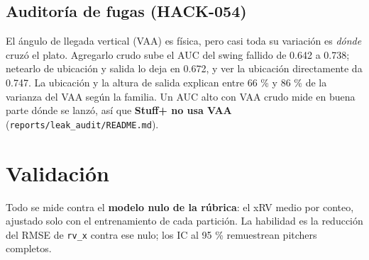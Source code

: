 \documentclass[
  english,
  spanish,
  10pt,
  letterpaper,
]{article}
\let\diablosTT\texttt
\renewcommand{\texttt}[1]{{\color{gris}\fontsize{8.2}{10}\selectfont\diablosTT{#1}}}
\begin{document}
\subsection{Auditoría de fugas
(HACK-054)}\label{auditoruxeda-de-fugas-hack-054}

El ángulo de llegada vertical (VAA) es física, pero casi toda su
variación es \emph{dónde} cruzó el plato. Agregarlo crudo sube el AUC
del swing fallido de 0.642 a 0.738; netearlo de ubicación y salida lo
deja en 0.672, y ver la ubicación directamente da 0.747. La ubicación y
la altura de salida explican entre 66 \% y 86 \% de la varianza del VAA
según la familia. Un AUC alto con VAA crudo mide en buena parte dónde se
lanzó, así que \textbf{Stuff+ no usa VAA}
(\texttt{reports/leak\_audit/README.md}).

\section{Validación}\label{validaciuxf3n}

Todo se mide contra el \textbf{modelo nulo de la rúbrica}: el xRV medio
por conteo, ajustado solo con el entrenamiento de cada partición. La
habilidad es la reducción del RMSE de \texttt{rv\_x} contra ese nulo;
los IC al 95 \% remuestrean pitchers completos.
\end{document}

